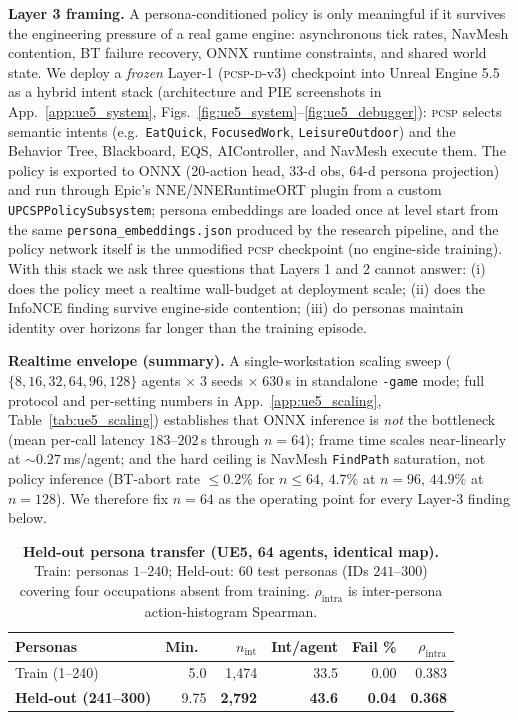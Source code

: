 \documentclass[conference]{IEEEtran}
\newcommand{\PCSP}{\textsc{pcsp}\xspace}
\newcommand{\PCSPD}{\textsc{pcsp-d}\xspace}
\begin{document}
\noindent\textbf{Layer 3 framing.}
A persona-conditioned policy is only meaningful if it survives the
engineering pressure of a real game engine: asynchronous tick rates,
NavMesh contention, BT failure recovery, ONNX runtime constraints, and
shared world state. We deploy a \emph{frozen} Layer-1 (\PCSPD{}-v3)
checkpoint into Unreal Engine 5.5 as a hybrid intent stack
(architecture and PIE screenshots in App.~\ref{app:ue5_system},
Figs.~\ref{fig:ue5_system}--\ref{fig:ue5_debugger}): \PCSP{} selects
semantic intents (e.g.\ \texttt{EatQuick}, \texttt{FocusedWork},
\texttt{LeisureOutdoor}) and the Behavior Tree, Blackboard, EQS,
AIController, and NavMesh execute them. The policy is exported to ONNX
(20-action head, $33$-d obs, $64$-d persona projection) and run through
Epic's NNE/NNERuntimeORT plugin from a custom
\texttt{UPCSPPolicySubsystem}; persona embeddings are loaded once at
level start from the same \texttt{persona\_embeddings.json} produced by
the research pipeline, and the policy network itself is the unmodified
\PCSP{} checkpoint (no engine-side training).
With this stack we ask three questions that Layers 1 and 2 cannot
answer: (i) does the policy meet a realtime wall-budget at deployment
scale; (ii) does the InfoNCE finding survive engine-side contention;
(iii) do personas maintain identity over horizons far longer than the
training episode.

\textbf{Realtime envelope (summary).}
A single-workstation scaling sweep
($\{8,16,32,64,96,128\}$ agents $\times\;3$ seeds $\times\;630$\,s in
standalone \texttt{-game} mode; full protocol and per-setting numbers in
App.~\ref{app:ue5_scaling}, Table~\ref{tab:ue5_scaling}) establishes that
ONNX inference is \emph{not} the bottleneck (mean per-call latency
$183$--$202$\,\textmu s through $n{=}64$); frame time scales near-linearly
at $\sim\!0.27$\,ms/agent; and the hard ceiling is NavMesh \texttt{FindPath}
saturation, not policy inference (BT-abort rate $\leq\!0.2\%$ for $n{\leq}64$,
$4.7\%$ at $n{=}96$, $44.9\%$ at $n{=}128$). We therefore fix
$n\!=\!64$ as the operating point for every Layer-3 finding below.

\begin{table}[t]
  \centering
  \small
  \caption{%
    \textbf{Held-out persona transfer (UE5, 64 agents, identical map).}
    Train: personas $1$--$240$; Held-out: $60$ test personas (IDs
    $241$--$300$) covering four occupations absent from training.
    $\rho_{\text{intra}}$ is inter-persona action-histogram Spearman.}
  \label{tab:ue5_heldout}
  \setlength{\tabcolsep}{4pt}
  \begin{tabular}{lrrrrr}
    \toprule
    Personas & Min.\ & $n_{\text{int}}$ & Int/agent & Fail \% & $\rho_{\text{intra}}$ \\
    \midrule
    Train (1--240)   & 5.0  & 1{,}474 & 33.5 & 0.00 & 0.383 \\
    \textbf{Held-out (241--300)} & 9.75 & \textbf{2{,}792} & \textbf{43.6} & \textbf{0.04} & \textbf{0.368} \\
    \bottomrule
  \end{tabular}
\end{table}
\end{document}

